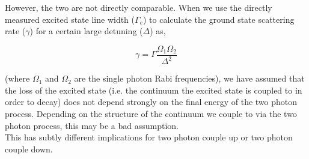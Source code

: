 \documentclass[10pt,fleqn]{article}
\begin{document}
However, the two are not directly comparable. When we use the directly measured
excited state line width ($\Gamma_e$) to calculate the ground state scattering rate ($\gamma$)
for a certain large detuning ($\Delta$) as,

\[ \gamma=\Gamma\frac{\Omega_1\Omega_2}{\Delta^2} \]

(where $\Omega_1$ and $\Omega_2$ are the single photon Rabi frequencies), we have
assumed that the loss of the excited state
(i.e. the continuum the excited state is coupled to in order to decay)
does not depend strongly on the final energy of the two photon process.
Depending on the structure of the continuum we couple to via the two photon process,
this may be a bad assumption.\\

This has subtly different implications for two photon couple up or two photon couple down.
\end{document}
